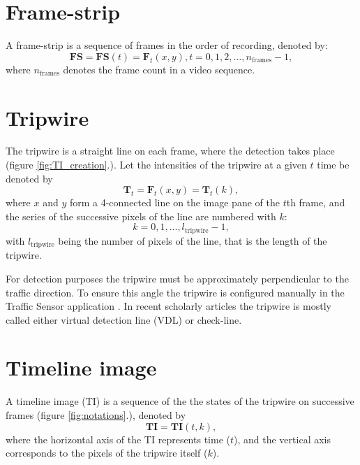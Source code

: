 \section{Frame-strip}
A frame-strip is a sequence of frames in the order of recording, denoted by:
\begin{displaymath}
	\boldsymbol{FS}=\boldsymbol{FS}(t)=\boldsymbol{F}_t(x,y),
	t=0,1,2,\dotsc,n_{\text{frames}}-1,
\end{displaymath}
where $n_{\text{frames}}$ denotes the frame count in a video sequence.
\section{Tripwire}
The tripwire is a straight line on each frame, where the detection takes place (figure \ref{fig:TI_creation}.).
Let the intensities of the tripwire at a given $t$ time be denoted by 
\begin{displaymath}
\boldsymbol{T}_t=\boldsymbol{F}_t(x,y)=\boldsymbol{T}_t(k),
\end{displaymath}
where $x$ and $y$ form a 4-connected line on the image pane of the $t$th frame, and the series of the successive pixels of the line are numbered with $k$:
\begin{displaymath}
	k=0,1,\dotsc,l_{\text{tripwire}}-1,
\end{displaymath}
with $l_{\text{tripwire}}$ being the number of pixels of the line, that is the length of the tripwire.

For detection purposes the tripwire must be approximately perpendicular to the traffic direction.
To ensure this angle the tripwire is configured manually in the Traffic Sensor application .
In recent scholarly articles the tripwire is mostly called either virtual detection line (VDL) or check-line.
\section{Timeline image}
A timeline image (TI) is a sequence of the the states of the tripwire on successive frames (figure \ref{fig:notations}.), denoted by
\begin{displaymath}
	\boldsymbol{TI}=\boldsymbol{TI}(t,k),
\end{displaymath}
where the horizontal axis of the TI represents time ($t$), and the vertical axis corresponds to the pixels of the tripwire itself ($k$).
 
